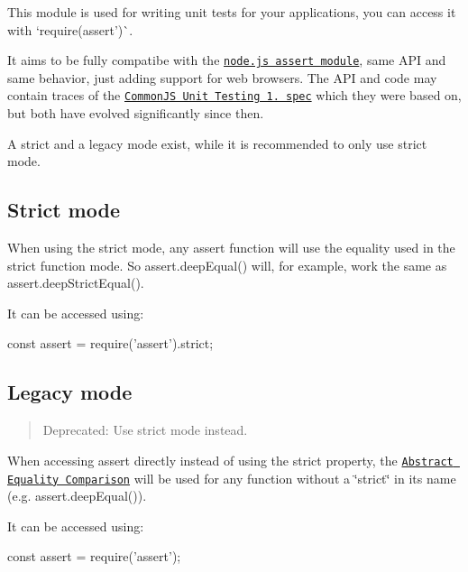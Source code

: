 \href{https://travis-ci.org/browserify/commonjs-assert}{\tt }

This module is used for writing unit tests for your applications, you can access it with `require(\textquotesingle{}assert')\`{}.

It aims to be fully compatibe with the \href{http://nodejs.org/api/assert.html}{\tt node.\+js assert module}, same A\+PI and same behavior, just adding support for web browsers. The A\+PI and code may contain traces of the \href{http://wiki.commonjs.org/wiki/Unit_Testing/1.0}{\tt Common\+JS Unit Testing 1. spec} which they were based on, but both have evolved significantly since then.

A {\ttfamily strict} and a {\ttfamily legacy} mode exist, while it is recommended to only use {\ttfamily strict mode}.

\subsection*{Strict mode}

When using the {\ttfamily strict mode}, any {\ttfamily assert} function will use the equality used in the strict function mode. So {\ttfamily assert.\+deep\+Equal()} will, for example, work the same as {\ttfamily assert.\+deep\+Strict\+Equal()}.

It can be accessed using\+:


\begin{DoxyCode}
const assert = require('assert').strict;
\end{DoxyCode}


\subsection*{Legacy mode}

\begin{quote}
Deprecated\+: Use strict mode instead. \end{quote}


When accessing {\ttfamily assert} directly instead of using the {\ttfamily strict} property, the \href{https://tc39.github.io/ecma262/#sec-abstract-equality-comparison}{\tt Abstract Equality Comparison} will be used for any function without a \char`\"{}strict\char`\"{} in its name (e.\+g. {\ttfamily assert.\+deep\+Equal()}).

It can be accessed using\+:


\begin{DoxyCode}
const assert = require('assert');
\end{DoxyCode}


